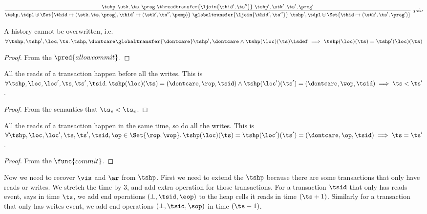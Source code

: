 \[
    \infer[join]{%
        \tshp, \tdpl \uplus \Set{ \thid \mapsto (\stk, \ts, \prog), \thid' \mapsto (\stk', \ts'', \pemp) } \ \globaltransfer{\ljoin{\thid',\ts''}} \  \tshp', \tdpl \uplus \Set{ \thid \mapsto (\stk', \ts', \prog')}
    }{%
        \tshp, \stk, \ts, \prog \ \threadtransfer{\ljoin{\thid',\ts''}} \  \tshp', \stk', \ts', \prog' 
    }
\]

\begin{lem}
    A history cannot be overwritten, i.e.\ \( \forall \tshp, \tshp', \loc,\ts \ldotp \tshp, \dontcare \globaltransfer{\dontcare} \tshp', \dontcare \land \tshp(\loc)(\ts)\isdef \implies \tshp(\loc)(\ts) = \tshp'(\loc)(\ts)\)
\end{lem}
\begin{proof}
    From the \( \pred{allowcommit} \).
\end{proof}

\begin{lem}
    \label{lem:read-before-write}
    All the reads of a transaction happen before all the writes. This is 
    \( \forall \tshp, \loc, \loc', \ts, \ts', \tsid \ldotp \tshp(\loc)(\ts) = (\dontcare, \rop, \tsid) \land \tshp(\loc')(\ts') = (\dontcare, \wop, \tsid) \implies \ts < \ts' \).
\end{lem}
\begin{proof}
    From the semantics that \( \ts_{s} < \ts_{e} \).
\end{proof}

\begin{lem}
    \label{lem:atoic-rw}
    All the reads of a transaction happen in the same time, so do all the writes. This is 
    \( \forall \tshp, \loc, \loc', \ts, \ts', \tsid, \op \in \Set{\rop, \wop} \ldotp \tshp(\loc)(\ts) =  \tshp(\loc')(\ts') = (\dontcare, \op, \tsid) \implies \ts = \ts' \).
\end{lem}
\begin{proof}
    From the \( \func{commit} \).
\end{proof}

Now we need to recover \( \vis \) and \( \ar \) from \( \tshp \).
First we need to extend the \( \tshp \) because there are some transactions that only have reads or writes.
We stretch the time by 3, and add extra operation for those transactions.
For a transaction \( \tsid \) that only has reads event, says in time \( \ts \), we add end operations \( (\bot, \tsid, \eop ) \) to the heap cells it reads in time \( (\ts + 1 ) \).
Similarly for a transaction that only has writes event, we add end operations \( (\bot, \tsid, \sop ) \) in time \( (\ts-1) \).


